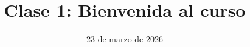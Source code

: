 
\title{Clase 1: Bienvenida al curso}
\date{23 de marzo de 2026}



\begin{frame}[plain]
	\titlepage
\end{frame}











